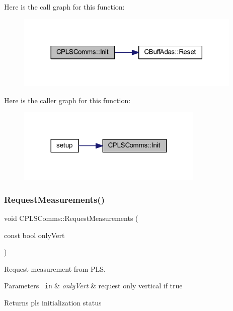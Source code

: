 Here is the call graph for this function\+:\nopagebreak
\begin{figure}[H]
\begin{center}
\leavevmode
\includegraphics[width=305pt]{class_c_p_l_s_comms_ae7f8d87ea15de35a120d65a7a8bbbb76_cgraph}
\end{center}
\end{figure}
Here is the caller graph for this function\+:\nopagebreak
\begin{figure}[H]
\begin{center}
\leavevmode
\includegraphics[width=252pt]{class_c_p_l_s_comms_ae7f8d87ea15de35a120d65a7a8bbbb76_icgraph}
\end{center}
\end{figure}
\mbox{\label{class_c_p_l_s_comms_ab69a49f5c4cd7b4b9f63fa16c7792920}} 
\subsubsection{\texorpdfstring{RequestMeasurements()}{RequestMeasurements()}}
{\footnotesize\ttfamily void C\+P\+L\+S\+Comms\+::\+Request\+Measurements (\begin{DoxyParamCaption}\item[{const bool}]{only\+Vert }\end{DoxyParamCaption})}



Request measurement from P\+LS. 


\begin{DoxyParams}[1]{Parameters}
\mbox{\texttt{ in}}  & {\em only\+Vert} & request only vertical if true \\
\hline
\end{DoxyParams}
\begin{DoxyReturn}{Returns}
pls initialization status 
\end{DoxyReturn}


